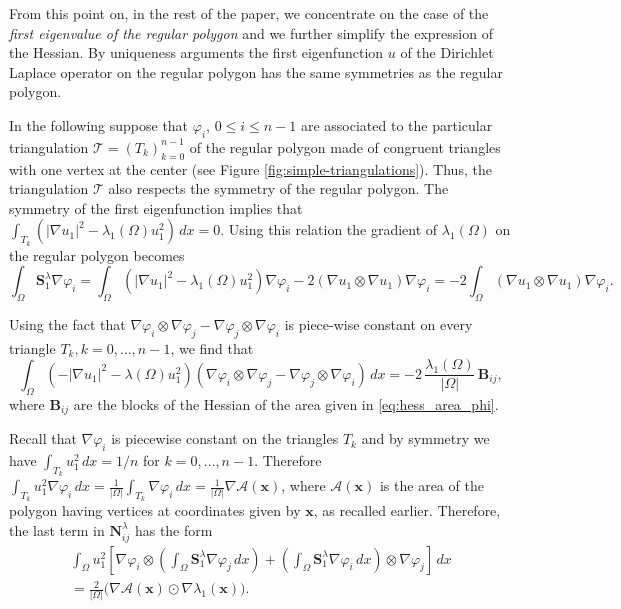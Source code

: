 \documentclass[JEP,XML,SOM,Unicode,ThmDefs,NoFloatCountersInSection,published]{cedram}
\theoremstyle{plain}
\theoremstyle{definition}
\newcommand{\bo}[1]{{\boldsymbol#1}}
\begin{document}
From this point on, in the rest of the paper, we concentrate on the case of the \emph{first eigenvalue of the regular polygon} and we further simplify the expression of the Hessian. By uniqueness arguments the first eigenfunction $u$ of the Dirichlet Laplace operator on the regular polygon has the same symmetries as the regular polygon.

In the following suppose that $\varphi_i$, $0 \leq i \leq n-1$ are associated to the particular triangulation $\mathcal T=(T_k)_{k=0}^{n-1}$ of the regular polygon made of congruent triangles with one vertex at the center (see Figure \ref{fig:simple-triangulations}). Thus, the triangulation $\mathcal T$ also respects the symmetry of the regular polygon. The symmetry of the first eigenfunction implies that $\int_{T_k}(|\nabla u_1|^2-\lambda_1(\Omega) u_1^2)\, dx=0$. Using this relation the gradient of $\lambda_1(\Omega)$ on the regular polygon becomes
\[
\int_\Omega \bo S_1^\lambda \nabla \varphi_i = \int_\Omega (|\nabla u_1|^2-\lambda_1(\Omega) u_1^2)\nabla \varphi_i - 2 (\nabla u_1 \otimes \nabla u_1) \nabla \varphi_i = -2 \int_\Omega (\nabla u_1 \otimes \nabla u_1) \nabla \varphi_i.
\]

Using the fact that $\nabla \varphi_i \otimes \nabla \varphi_j-\nabla \varphi_j \otimes \nabla \varphi_i$ is piece-wise constant on every triangle $T_k, k=0,\dots,n-1$, we find that
\[
\int_\Omega \left(-|\nabla u_1|^2-\lambda(\Omega) u_1^2\right) (\nabla \varphi_i \otimes \nabla \varphi_j-\nabla \varphi_j \otimes \nabla \varphi_i) \, dx = -2\,\frac{\lambda_1(\Omega)}{|\Omega|}\, \bo B_{ij},
\]
where $\bo B_{ij}$ are the blocks of the Hessian of the area given in \eqref{eq:hess_area_phi}.

Recall that $\nabla \varphi_i$ is piecewise constant on the triangles $T_k$ and by symmetry we have $\int_{T_k} u_1^2\, dx = 1/n$ for $k=0,\dots,n-1$. Therefore $\int_{T_k} u_1^2 \nabla \varphi_i\, dx = \frac{1}{|\Omega|} \int_{T_k}\nabla \varphi_i\, dx=\frac{1}{|\Omega|} \nabla \mathcal A(\bo x)$, where $\mathcal A(\bo x)$ is the area of the polygon having vertices at coordinates given by $\bo x$, as recalled earlier. Therefore, the last term in $\bo N_{ij}^\lambda$ has the form
\vspace*{-5pt}
\begin{multline*}
\int_\Omega u_1^2\left[\nabla \varphi_i \otimes \left(\int_\Omega \bo S_1^\lambda \nabla \varphi_j\, dx \right)+
\left(\int_\Omega \bo S_1^\lambda \nabla \varphi_i\, dx \right)\otimes \nabla \varphi_j \right]\, dx \\
= \frac{2}{|\Omega|} \bigl(\nabla \mathcal A(\bo x) \odot \nabla \lambda_1(\bo x)\bigr).
\end{multline*}
\end{document}
